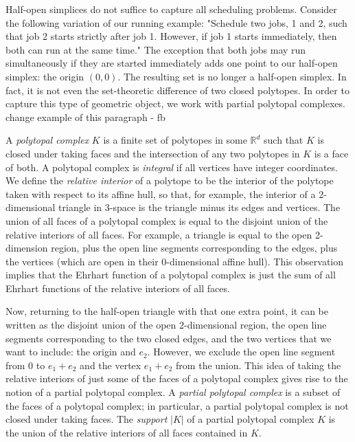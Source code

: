 \documentclass[12pt,reqno]{amsart}
\numberwithin{definition}{section}
\theoremstyle{definition}
\newcommand{\RR}{\mathbb{R}}
\newcommand{\comment}[1]{\textsf{\footnotesize #1}}
\begin{document}
Half-open simplices do not suffice to capture all scheduling problems. Consider the following variation of our running example: "Schedule two jobs, 1 and 2, such that job 2 starts strictly after job 1. However, if job 1 starts immediately, then both can run at the same time." The exception that both jobs may run simultaneously if they are started immediately adds one point to our half-open simplex: the origin $(0,0)$. The resulting set is no longer a half-open simplex. In fact, it is not even the set-theoretic difference of two closed polytopes. In order to capture this type of geometric object, we work with partial polytopal complexes. \comment{change example of this paragraph - fb}

%

A \emph{polytopal complex} $K$ is a finite set of polytopes in some $\RR^d$ such that $K$ is closed under taking faces and the intersection of any two polytopes in $K$ is a face of both. A polytopal complex is \emph{integral} if all vertices have integer coordinates. We define the \emph{relative interior} of a polytope to be the interior of the polytope taken with respect to its affine hull, so that, for example, the interior of a 2-dimensional triangle in 3-space is the triangle minus its edges and vertices. 
 The union of all faces of a polytopal complex is equal to the disjoint union of the relative interiors of all faces. For example, a triangle is equal to the open 2-dimension region, plus the open line segments corresponding to the edges, plus the vertices (which are open in their 0-dimensional affine hull). This observation implies that the Ehrhart function of a polytopal complex is just the sum of all Ehrhart functions of the relative interiors of all faces.

Now, returning to the half-open triangle with that one extra point, it can be written as the disjoint union of the open 2-dimensional region, the open line segments corresponding to the two closed edges, and the two vertices that we want to include: the origin and $e_2$. However, we exclude the open line segment from 0 to $e_1+e_2$ and the vertex $e_1+e_2$ from the union. This idea of taking the relative interiors of just some of the faces of a polytopal complex gives rise to the notion of a partial polytopal complex. A \emph{partial polytopal complex} is a subset of the faces of a polytopal complex; in particular, a partial polytopal complex is not closed under taking faces. The \emph{support} $|K|$ of a partial polytopal complex $K$ is the union of the relative interiors of all faces contained in $K$.
\end{document}
